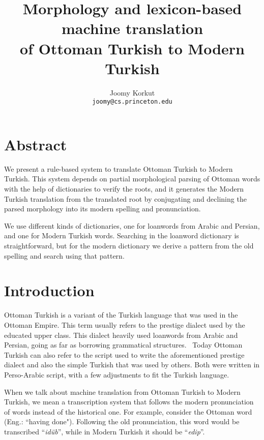 \documentclass[10pt,twocolumn]{article}
\title{Morphology and lexicon-based machine translation\\of Ottoman Turkish to Modern Turkish}
\author{
  Joomy Korkut\\
  \texttt{joomy@cs.princeton.edu}
}
\date{}
\theoremstyle{nonumberplain}
\newcommand{\otto}[1]{\RLE{\ottoman{}\Large{}#1}}
\newcommand{\word}[1]{``\emph{#1}''}
\begin{document}
\setlength{\abovedisplayskip}{-17pt}
\setlength{\belowdisplayskip}{0pt}
\setlength{\abovedisplayshortskip}{0pt}
\setlength{\belowdisplayshortskip}{0pt}

\maketitle

\section*{Abstract}
We present a rule-based system to translate Ottoman Turkish to Modern Turkish.
This system depends on partial morphological parsing of Ottoman words with the help of
dictionaries to verify the roots, and it generates the Modern Turkish
translation from the translated root by conjugating and declining the parsed
morphology into its modern spelling and pronunciation.

We use different kinds of dictionaries, one for loanwords from Arabic and
Persian, and one for Modern Turkish words. Searching in the loanword dictionary
is straightforward, but for the modern dictionary we derive a pattern from the
old spelling and search using that pattern.

\section{Introduction}

Ottoman Turkish is a variant of the Turkish language that was used in the
Ottoman Empire. This term usually refers to the prestige dialect used by the
educated upper class. This dialect heavily used loanwords from Arabic and
Persian, going as far as borrowing grammatical structures.~\cite{strauss2011linguistic}
Today Ottoman Turkish can also refer to the script used to write the
aforementioned prestige dialect and also the simple Turkish that was used by
others. Both were written in Perso-Arabic script, with a few adjustments to fit
the Turkish language.

When we talk about machine translation from Ottoman Turkish to Modern Turkish,
we mean a transcription system that follows the modern pronunciation of words
instead of the historical one.
For example, consider the Ottoman word \otto{ايدوب} (Eng.: ``having done").
Following the old pronunciation, this word would be transcribed \word{idüb}, while
in Modern Turkish it should be \word{edip}.
\end{document}
